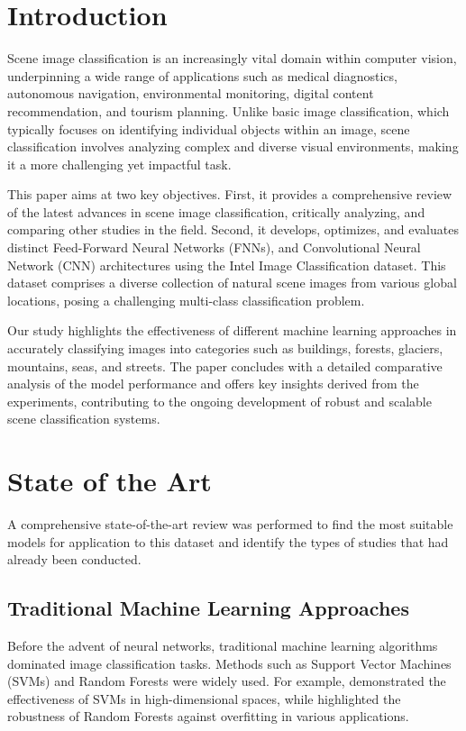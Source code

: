 \section{Introduction}
\label{sec:Introduction}
Scene image classification is an increasingly vital domain within computer vision, underpinning a wide range of applications such as medical diagnostics, autonomous navigation, environmental monitoring, digital content recommendation, and tourism planning. Unlike basic image classification, which typically focuses on identifying individual objects within an image, scene classification involves analyzing complex and diverse visual environments, making it a more challenging yet impactful task.

This paper aims at two key objectives. First, it provides a comprehensive review of the latest advances in scene image classification, critically analyzing, and comparing other studies in the field. Second, it develops, optimizes, and evaluates distinct Feed-Forward Neural Networks (FNNs), and Convolutional Neural Network (CNN) architectures using the Intel Image Classification dataset. This dataset comprises a diverse collection of natural scene images from various global locations, posing a challenging multi-class classification problem.

Our study highlights the effectiveness of different machine learning approaches in accurately classifying images into categories such as buildings, forests, glaciers, mountains, seas, and streets. The paper concludes with a detailed comparative analysis of the model performance and offers key insights derived from the experiments, contributing to the ongoing development of robust and scalable scene classification systems.

\section{State of the Art} \label{sec}

A comprehensive state-of-the-art review was performed to find the most suitable models for application to this dataset and identify the types of studies that had already been conducted.

\subsection{Traditional Machine Learning Approaches}

Before the advent of neural networks, traditional machine learning algorithms dominated image classification tasks. Methods such as Support Vector Machines (SVMs) and Random Forests were widely used. For example, \cite{svm_example} demonstrated the effectiveness of SVMs in high-dimensional spaces, while \cite{rf_example} highlighted the robustness of Random Forests against overfitting in various applications.

